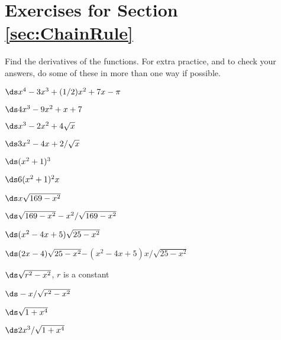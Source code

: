 \section*{Exercises for Section \ref{sec:ChainRule}}

\begin{enumialphparenastyle}

Find the derivatives of the functions. For extra practice, and to
check your answers, do some of these in more than one way if
possible. 

\begin{ex}  $\ds x^4-3x^3+(1/2)x^2+7x-\pi$
\begin{sol} 
$\ds 4x^3-9x^2+x+7$
\end{sol}
\end{ex}

\begin{ex}  $\ds x^3-2x^2+4\sqrt{x}$
\begin{sol} 
$\ds 3x^2-4x+2/\sqrt{x}$
\end{sol}
\end{ex}

\begin{ex}  $\ds (x^2+1)^3$
\begin{sol} 
$\ds 6(x^2+1)^2x$
\end{sol}
\end{ex}

\begin{ex}  $\ds x\sqrt{169-x^2}$
\begin{sol} 
$\ds \sqrt{169-x^2}-x^2/\sqrt{169-x^2}$
\end{sol}
\end{ex}

\begin{ex}  $\ds (x^2-4x+5)\sqrt{25-x^2}$
\begin{sol} 
$\ds  (2x-4)\sqrt{25-x^2}-$\hfill\break$(x^2-4x+5)x/\sqrt{25-x^2}$
\end{sol}
\end{ex}

\begin{ex}  $\ds \sqrt{r^2-x^2}$, $r$ is a constant
\begin{sol} 
$\ds -x/\sqrt{r^2-x^2}$
\end{sol}
\end{ex}

\begin{ex}  $\ds \sqrt{1+x^4}$
\begin{sol} 
$\ds 2x^3/\sqrt{1+x^4}$
\end{sol}
\end{ex}


\end{enumialphparenastyle}
